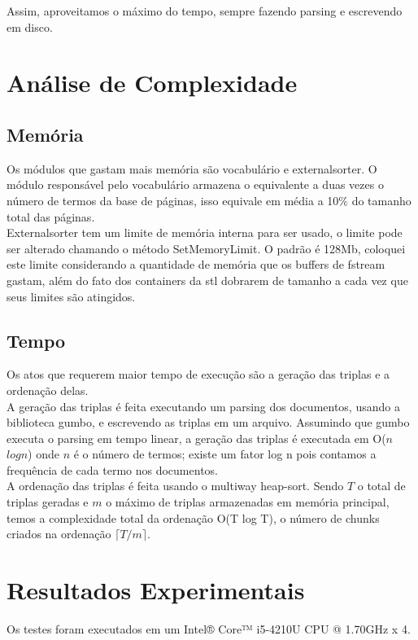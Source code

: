 \documentclass[11pt]{article}
\begin{document}
Assim, aproveitamos o máximo do tempo, sempre fazendo parsing e escrevendo em disco.


\section{Análise de Complexidade}

\subsection{Memória}

Os módulos que gastam mais memória são vocabulário e externalsorter. O módulo responsável pelo vocabulário armazena o equivalente a duas vezes o número de termos da base de páginas, isso equivale em média a 10$\%$ do tamanho total das páginas.\\
Externalsorter tem um limite de memória interna para ser usado, o limite pode ser alterado chamando o método SetMemoryLimit. O padrão é 128Mb, coloquei este limite considerando a quantidade de memória que os buffers de fstream gastam, além do fato dos containers da stl dobrarem de tamanho a cada vez que seus limites são atingidos.

\subsection{Tempo}
Os atos que requerem maior tempo de execução são a geração das triplas e a ordenação delas.\\
A geração das triplas é feita executando um parsing dos documentos, usando a biblioteca gumbo, e escrevendo as triplas em um arquivo. Assumindo que gumbo executa o parsing em tempo linear, a geração das triplas é executada em O($n$ $log n$) onde $n$ é o número de termos; existe um fator log n pois contamos a frequência de cada termo nos documentos.\\
A ordenação das triplas é feita usando o multiway heap-sort. Sendo $T$ o total de triplas geradas e $m$ o máximo de triplas armazenadas em memória principal, temos a complexidade total da ordenação O(T log T), o número de chunks criados na ordenação $\lceil T/m \rceil$.


\section{Resultados Experimentais}

Os testes foram executados em um Intel® Core™ i5-4210U CPU @ 1.70GHz x 4.
\end{document}
